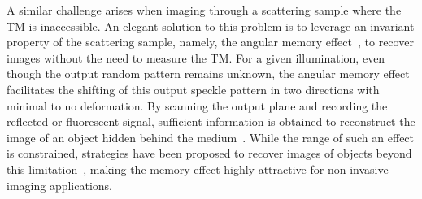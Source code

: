 \documentclass[aps,prl,twocolumn, amsmath,amssymb,superscriptaddress]{revtex4-2}
\begin{document}

A similar challenge arises when imaging through a scattering sample where the TM is inaccessible.
An elegant solution to this problem is to leverage an invariant property of the scattering sample,
namely, the angular memory effect~\cite{bertolotti2012non-invasive}, to recover images
without the need to measure the TM.
For a given illumination, even though the output random pattern remains unknown,
the angular memory effect facilitates the shifting of this output speckle pattern in two directions
with minimal to no deformation.
By scanning the output plane and recording the reflected or fluorescent signal,
sufficient information is obtained to reconstruct the image of an object hidden behind the medium~\cite{bertolotti2012non-invasive}.
While the range of such an effect is constrained, strategies have been proposed to recover images of objects beyond this limitation~\cite{yeminy2021Guidestar},
making the memory effect highly attractive for non-invasive imaging applications.

\end{document}
